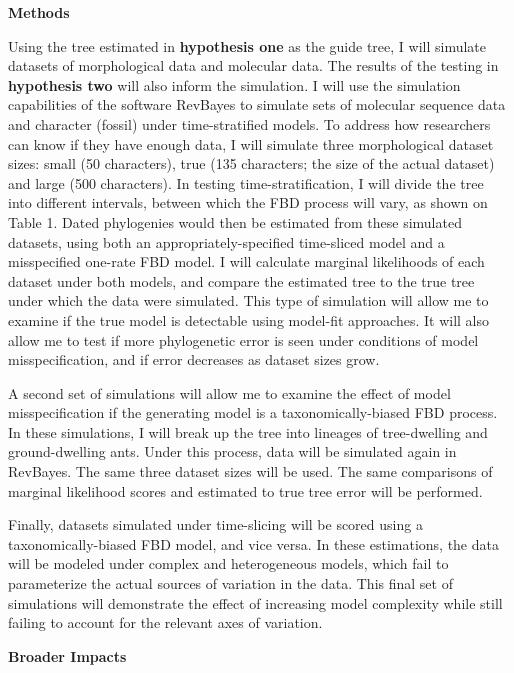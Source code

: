 \documentclass[12pt]{article}
\begin{document}
\textbf{Methods} \par
Using the tree estimated in \textbf{hypothesis one} as the guide tree, I will simulate datasets of morphological data and molecular data. 
The results of the testing in \textbf{hypothesis two} will also inform the simulation.
I will use the simulation capabilities of the software RevBayes to simulate sets of molecular sequence data and character (fossil) under time-stratified models.
To address how researchers can know if they have enough data, I will simulate three morphological dataset sizes: small (50 characters), true (135 characters; the size of the actual dataset) and large (500 characters).
In testing time-stratification, I will divide the tree into different intervals, between which the FBD process will vary, as shown on Table 1.
Dated phylogenies would then be estimated from these simulated datasets, using both an appropriately-specified time-sliced model and a misspecified one-rate FBD model.
I will calculate marginal likelihoods of each dataset under both models, and compare the estimated tree to the true tree under which the data were simulated.
This type of simulation will allow me to examine if the true model is detectable using model-fit approaches.
It will also allow me to test if more phylogenetic error is seen under conditions of model misspecification, and if error decreases as dataset sizes grow. \par
A second set of simulations will allow me to examine the effect of model misspecification if the generating model is a taxonomically-biased FBD process. 
In these simulations, I will break up the tree into lineages of tree-dwelling and ground-dwelling ants. 
Under this process, data will be simulated again in RevBayes.
The same three dataset sizes will be used. 
The same comparisons of marginal likelihood scores and estimated to true tree error will be performed.
\par
Finally, datasets simulated under time-slicing will be scored using a taxonomically-biased FBD model, and vice versa.
In these estimations, the data will be modeled under complex and heterogeneous models, which fail to parameterize the actual sources of variation in the data.
This final set of simulations will demonstrate the effect of increasing model complexity while still failing to account for the relevant axes of variation. \par

\textbf{Broader Impacts} \par
\end{document}

